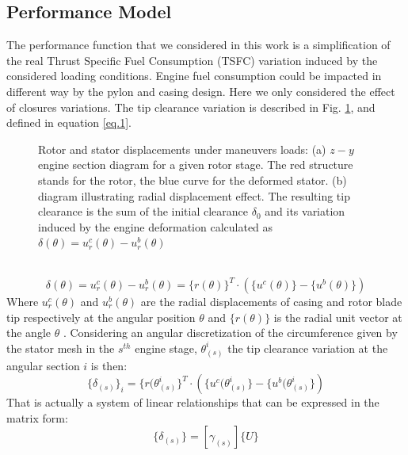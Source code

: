 \subsection{Performance Model}
\label{ssec1.2.2}
The performance function that we considered in this work is a simplification of the real Thrust Specific Fuel Consumption (TSFC) variation induced by the considered loading conditions. Engine fuel consumption could be impacted in different way by the pylon and casing design. Here we only considered the effect of closures variations.
The tip clearance variation is described in Fig. \ref{f.2}, and defined in equation \ref{eq.1}.
  \\
  \begin{figure}[hbt!]
  \centering
       \caption{Rotor and stator displacements under maneuvers loads: (a) $z-y$ engine section diagram for a given rotor stage. The red structure stands for the rotor, the blue curve for the deformed stator. (b) diagram illustrating radial displacement effect.
       The resulting tip clearance is the sum of the initial clearance $\delta_0$ and its variation induced by the engine deformation calculated as $\delta(\theta)=u_r^c(\theta)-u_r^b(\theta)$ }
       \label{f.2}
     \end{figure}
  \\
\begin{equation}
\label{eq.1}
\delta(\theta)=u_r^c(\theta)-u_r^b(\theta)=\lbrace r( \theta ) \rbrace^T \cdot \left( \lbrace u^c(\theta) \rbrace-\lbrace u^b(\theta) \rbrace\right)
\end{equation}
Where $u_r^c(\theta)$ and $u_r^b(\theta)$  are the radial displacements of casing and rotor blade tip respectively at the angular position $\theta$ and $\lbrace r( \theta ) \rbrace$ is the radial unit vector at the angle $\theta$ .
Considering an angular discretization of the circumference given by the stator mesh in the $s^{th}$ engine stage, $\theta^i_{(s)}$ the tip clearance variation at the angular section $i$ is then:	
\begin{equation}
\lbrace\delta_{(s)}\rbrace_i=\lbrace r( \theta^i_{(s) } \rbrace^T \cdot \left( \lbrace u^c(\theta^i_{(s)} \rbrace-\lbrace u^b(\theta^i_{(s)} \rbrace\right)
\end{equation}
That is actually a system of linear relationships that can be expressed in the matrix form:
\begin{equation}
\label{e.3}
\lbrace\delta_{(s)}\rbrace =\left[ \gamma_{(s)} \right] \lbrace U \rbrace
\end{equation}
